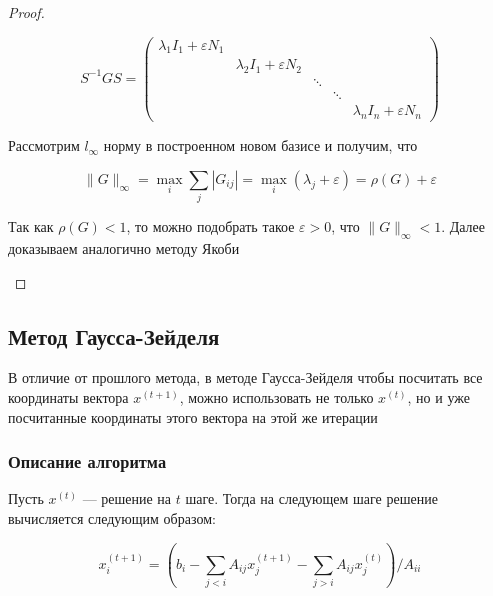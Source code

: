 \begin{proof}
\begin{itemize}
        \[
        S^{-1} G S =
        \begin{pmatrix}
        \lambda_1 I_1 + \varepsilon N_1   &                                   &        &         & \\
                                          & \lambda_2 I_1 + \varepsilon N_2   &        &         & \\
                                          &                                   & \ddots &         & \\
                                          &                                   &        &  \ddots & \\
                                          &                                   &        &         & \lambda_n I_n + \varepsilon N_n
        \end{pmatrix}
        \]

        Рассмотрим $l_{\infty}$ норму в построенном новом базисе и получим, что

        \[
        \lVert G \rVert_{\infty} = \max\limits_{i} \sum\limits_{j} |G_{ij}| = \max\limits_{i} (\lambda_j + \varepsilon) = \rho(G) + \varepsilon
        \]

        Так как $\rho(G) < 1$, то можно подобрать такое $\varepsilon > 0$, что $\lVert G \rVert_{\infty} < 1$. Далее доказываем аналогично методу Якоби
    \end{itemize}
\end{proof}

\newpage

\subsection{Метод Гаусса-Зейделя}\label{Gauss-Zeldel method}

В отличие от прошлого метода, в методе Гаусса-Зейделя чтобы посчитать все координаты вектора $x^{(t+1)}$, можно использовать не только $x^{(t)}$, но и уже посчитанные координаты этого вектора на этой же итерации

\subsubsection*{Описание алгоритма}

Пусть $x^{(t)}$ --- решение на $t$ шаге. Тогда на следующем шаге решение вычисляется следующим образом:

\[
x_i^{(t+1)} = \left( b_i - \sum\limits_{j < i} A_{ij} x_j^{(t+1)} - \sum\limits_{j > i} A_{ij} x_j^{(t)} \right) / A_{ii}
\]

